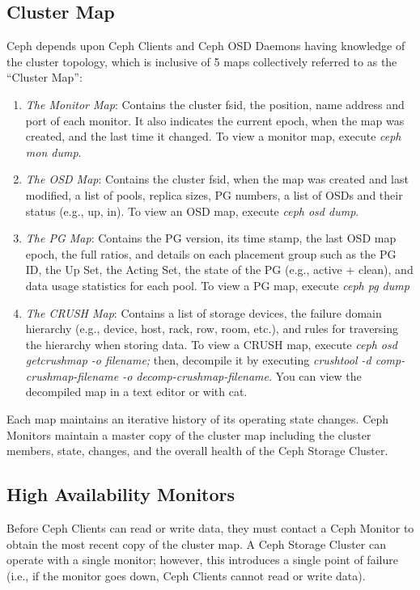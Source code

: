 \documentclass[12pt,a4paper]{report}
\begin{document}
\subsection{Cluster Map} \label{cluster_map}

Ceph depends upon Ceph Clients and Ceph OSD Daemons having knowledge of the
cluster topology, which is inclusive of 5 maps collectively referred to as the
``Cluster Map'':
\begin{enumerate}
	\item \emph{The Monitor Map}: Contains the cluster fsid, the position,
		name address and port of each monitor. It also indicates the
		current epoch, when the map was created, and the last time it
		changed. To view a monitor map, execute \emph{ceph mon dump}.
	\item \emph{The OSD Map}: Contains the cluster fsid, when the map was
		created and last modified, a list of pools, replica sizes, PG
		numbers, a list of OSDs and their status (e.g., up, in). To
		view an OSD map, execute \emph{ceph osd dump}.
	\item \emph{The PG Map}: Contains the PG version, its time stamp, the
		last OSD map epoch, the full ratios, and details on each
		placement group such as the PG ID, the Up Set, the Acting Set,
		the state of the PG (e.g., active + clean), and data usage
		statistics for each pool. To view a PG map, execute \emph{ceph pg dump}
	\item \emph{The CRUSH Map}: Contains a list of storage devices, the
		failure domain hierarchy (e.g., device, host, rack, row, room,
		etc.), and rules for traversing the hierarchy when storing
		data. To view a CRUSH map, execute \emph{ceph osd getcrushmap -o
		filename;} then, decompile it by executing \emph{crushtool -d
		comp-crushmap-filename -o decomp-crushmap-filename}. You can
		view the decompiled map in a text editor or with cat.
\end{enumerate}

Each map maintains an iterative history of its operating state changes. Ceph
Monitors maintain a master copy of the cluster map including the cluster
members, state, changes, and the overall health of the Ceph Storage Cluster.

\subsection{High Availability Monitors}

Before Ceph Clients can read or write data, they must contact a Ceph Monitor to
obtain the most recent copy of the cluster map. A Ceph Storage Cluster can
operate with a single monitor; however, this introduces a single point of
failure (i.e., if the monitor goes down, Ceph Clients cannot read or write
data).
\end{document}

